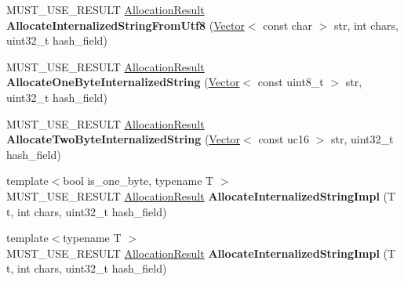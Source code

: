 \begin{DoxyCompactItemize}
\item 
M\+U\+S\+T\+\_\+\+U\+S\+E\+\_\+\+R\+E\+S\+U\+LT \hyperlink{classv8_1_1internal_1_1_allocation_result}{Allocation\+Result} {\bfseries Allocate\+Internalized\+String\+From\+Utf8} (\hyperlink{classv8_1_1internal_1_1_vector}{Vector}$<$ const char $>$ str, int chars, uint32\+\_\+t hash\+\_\+field)\hypertarget{classv8_1_1internal_1_1_heap_a58a3c3c18b5e533f6654b584fd93e03b}{}\label{classv8_1_1internal_1_1_heap_a58a3c3c18b5e533f6654b584fd93e03b}

\item 
M\+U\+S\+T\+\_\+\+U\+S\+E\+\_\+\+R\+E\+S\+U\+LT \hyperlink{classv8_1_1internal_1_1_allocation_result}{Allocation\+Result} {\bfseries Allocate\+One\+Byte\+Internalized\+String} (\hyperlink{classv8_1_1internal_1_1_vector}{Vector}$<$ const uint8\+\_\+t $>$ str, uint32\+\_\+t hash\+\_\+field)\hypertarget{classv8_1_1internal_1_1_heap_afeca7382f82c0f168442681a0d869968}{}\label{classv8_1_1internal_1_1_heap_afeca7382f82c0f168442681a0d869968}

\item 
M\+U\+S\+T\+\_\+\+U\+S\+E\+\_\+\+R\+E\+S\+U\+LT \hyperlink{classv8_1_1internal_1_1_allocation_result}{Allocation\+Result} {\bfseries Allocate\+Two\+Byte\+Internalized\+String} (\hyperlink{classv8_1_1internal_1_1_vector}{Vector}$<$ const uc16 $>$ str, uint32\+\_\+t hash\+\_\+field)\hypertarget{classv8_1_1internal_1_1_heap_aff4be865a2ad71e9b312530f0c9aabb3}{}\label{classv8_1_1internal_1_1_heap_aff4be865a2ad71e9b312530f0c9aabb3}

\item 
{\footnotesize template$<$bool is\+\_\+one\+\_\+byte, typename T $>$ }\\M\+U\+S\+T\+\_\+\+U\+S\+E\+\_\+\+R\+E\+S\+U\+LT \hyperlink{classv8_1_1internal_1_1_allocation_result}{Allocation\+Result} {\bfseries Allocate\+Internalized\+String\+Impl} (T t, int chars, uint32\+\_\+t hash\+\_\+field)\hypertarget{classv8_1_1internal_1_1_heap_a58dd7890db91ad6c53c713583a6e9fb4}{}\label{classv8_1_1internal_1_1_heap_a58dd7890db91ad6c53c713583a6e9fb4}

\item 
{\footnotesize template$<$typename T $>$ }\\M\+U\+S\+T\+\_\+\+U\+S\+E\+\_\+\+R\+E\+S\+U\+LT \hyperlink{classv8_1_1internal_1_1_allocation_result}{Allocation\+Result} {\bfseries Allocate\+Internalized\+String\+Impl} (T t, int chars, uint32\+\_\+t hash\+\_\+field)\hypertarget{classv8_1_1internal_1_1_heap_ae0ec60585d08e9fcf87ad544fe6e14ce}{}\label{classv8_1_1internal_1_1_heap_ae0ec60585d08e9fcf87ad544fe6e14ce}


\end{DoxyCompactItemize}
